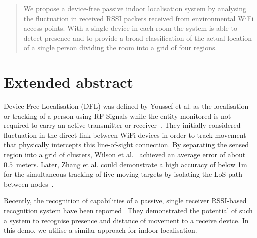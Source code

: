 \documentclass{sig-alternate-ipsn13}
\begin{document}
\maketitle
\begin{abstract}
We propose a device-free passive indoor localisation system by analysing the fluctuation in received RSSI packets received from environmental WiFi access points.
With a single device in each room the system is able to detect presence and to provide a broad classification of the actual location of a single person dividing the room into a grid of four regions. 
\end{abstract}


  \section{Extended abstract}
  Device-Free Localisation (DFL) was defined by Youssef et al. as the localisation or tracking of a person using RF-Signals while the entity monitored is not required to carry an active transmitter or receiver~\cite{Pervasive_Youssef_2007}.
  They initially considered fluctuation in the direct link between WiFi devices in order to track movement that physically intercepts this line-of-sight connection.
  By separating the sensed region into a grid of clusters, Wilson et al.~\cite{RFSensing_Wilson_2009} achieved an average error of about $0.5$~meters.
  Later, Zhang et al. could demonstrate a high accuracy of below 1m for the simultaneous tracking of five moving targets by isolating the LoS path between nodes~\cite{Pervasive_Zhang_2012}.


  Recently, the recognition of capabilities of a passive, single receiver RSSI-based recognition system have been reported~\cite{Pervasive_Sigg_2014}
  They demonstrated the potential of such a system to recognise presence and distance of movement to a receive device.
  In this demo, we utilise a similar approach for indoor localisation.
\end{document}
